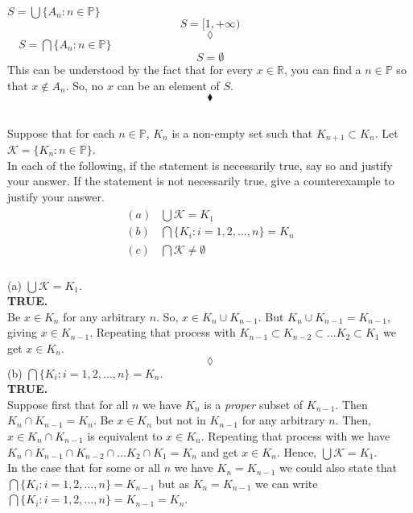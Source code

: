 \textbf{$S=\bigcup\{A_n:n\in\mathbb{P}\}$} \\
$$S=[1,+\infty)$$
$$\lozenge$$
\textbf{   $\quad S=\bigcap\{A_n:n\in\mathbb{P}\}$} \\
$$S=\emptyset$$
This can be understood by the fact that for every $x\in\mathbb{R}$, you can find a $n\in\mathbb{P}$ so that $x\not\in A_n$. So, no $x$ can be an element of $S$.
$$\blacklozenge$$

\subsection{}
\begin{tcolorbox}
Suppose that for each $n\in \mathbb{P}$, $K_n$ is a non-empty set such that $K_{n+1}\subset K_n$. Let $\mathscr{K}=\{K_n:n\in \mathbb{P}\}$.\\
In each of the following, if the statement is necessarily true, say so and justify your answer. If the statement is not necessarily true, give a counterexample to justify your answer.
 \begin{align*}
\begin{array}{ll}
(a)&\bigcup \mathscr{K}=K_1\\
(b)&\bigcap \{K_i:i=1,2,\dots,n\}= K_n\\
(c)&\bigcap \mathscr{K}\ne \emptyset\\
\end{array}
\end{align*}
\end{tcolorbox}
(a) $\bigcup \mathscr{K}=K_1$.\\
\textbf{TRUE.\\}
Be $x\in K_n$ for any arbitrary $n$. So, $x\in K_n \cup K_{n-1}$. But $ K_n \cup K_{n-1} = K_{n-1}$, giving $x\in K_{n-1}$. Repeating that process with $K_{n-1}\subset K_{n-2}\subset \dots K_2\subset K_1$ we get $x\in K_n$.
$$\lozenge$$
(b) $\bigcap \{K_i:i=1,2,\dots,n\}= K_n$.\\
\textbf{TRUE.\\}
Suppose first that for all $n$ we have $K_n$ is a \textit{proper} subset of $K_{n-1}$. Then $ K_{n}\cap K_{n-1}=K_n$. Be $x\in K_n$ but not in $K_{n-1}$ for any arbitrary $n$. Then,  $x\in K_{n}\cap K_{n-1}$ is equivalent to $x\in K_n$. Repeating that process with we have $K_n\cap K_{n-1}\cap K_{n-2}\cap \dots K_2\cap K_1= K_n$ and get $x\in K_n$. Hence, $\bigcup \mathscr{K}=K_1$.\\
In the case that for some or all $n$ we have $K_n=K_{n-1}$ we could also state that  $\bigcap \{K_i:i=1,2,\dots,n\}= K_{n-1}$ but as $K_n=K_{n-1}$ we can write  $\bigcap \{K_i:i=1,2,\dots,n\}= K_{n-1}=K_n$.\\
